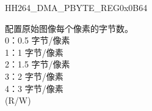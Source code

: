     
    \begin{register}{H}{H264\_DMA\_PBYTE\_REG}{0x0B64}\label{regdesc:H264DMAPBYTEREG}
    \regnewline%
    \begin{regdesc}\begin{reglist}
    \label{fielddesc:H264DMAORIPBYTE}\item [H264\_DMA\_ORI\_PBYTE] 配置原始图像每个像素的字节数。\\0：0.5 字节/像素\\1：1 字节/像素\\2：1.5 字节/像素\\3：2 字节/像素\\4：3 字节/像素\\(R/W)
    \end{reglist}\end{regdesc}
    \end{register}
    
